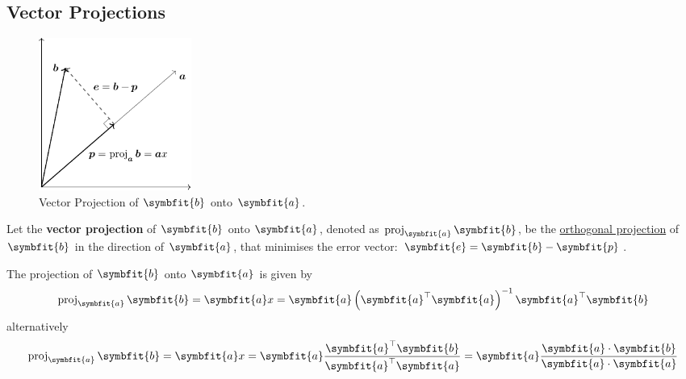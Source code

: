 \documentclass{article}
\begin{document}
\subsection{Vector Projections}
\begin{figure}[H]
    \centering
    \includegraphics[height=5cm, keepaspectratio]{figures/vector_projection.pdf}
    \caption{Vector Projection of \(\symbfit{b}\) onto \(\symbfit{a}\).}
\end{figure}
\begin{definition}
    Let the \textbf{vector projection} of \(\symbfit{b}\) onto
    \(\symbfit{a}\), denoted as \(\proj_{\symbfit{a}}\symbfit{b}\), be
    the \linebreak \underline{orthogonal projection} of \(\symbfit{b}\)
    in the direction of \(\symbfit{a}\), that minimises the error
    vector: \(\symbfit{e}=\symbfit{b}-\symbfit{p}\).
\end{definition}
\begin{theorem}
    The projection of \(\symbfit{b}\) onto \(\symbfit{a}\) is given by
    \begin{equation*}
        \proj_{\symbfit{a}}\symbfit{b} = \symbfit{a} x = \symbfit{a} \left( \symbfit{a}^\top \symbfit{a} \right)^{-1}\symbfit{a}^\top \symbfit{b}
    \end{equation*}
    alternatively
    \begin{equation*}
        \proj_{\symbfit{a}}\symbfit{b} = \symbfit{a} x = \symbfit{a} \frac{\symbfit{a}^\top \symbfit{b}}{\symbfit{a}^\top \symbfit{a}} = \symbfit{a} \frac{\symbfit{a}\cdot\symbfit{b}}{\symbfit{a}\cdot\symbfit{a}}
    \end{equation*}
\end{theorem}
\end{document}
